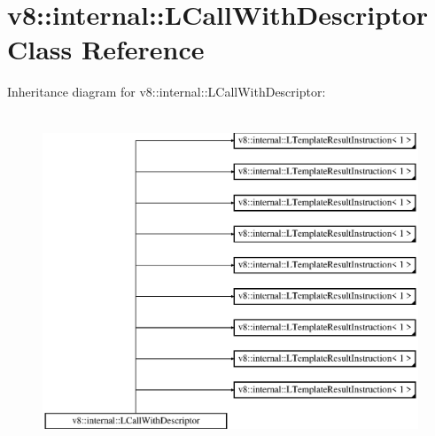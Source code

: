 \hypertarget{classv8_1_1internal_1_1_l_call_with_descriptor}{}\section{v8\+:\+:internal\+:\+:L\+Call\+With\+Descriptor Class Reference}
\label{classv8_1_1internal_1_1_l_call_with_descriptor}
Inheritance diagram for v8\+:\+:internal\+:\+:L\+Call\+With\+Descriptor\+:\begin{figure}[H]
\begin{center}
\leavevmode
\includegraphics[height=10.000000cm]{classv8_1_1internal_1_1_l_call_with_descriptor}
\end{center}
\end{figure}
